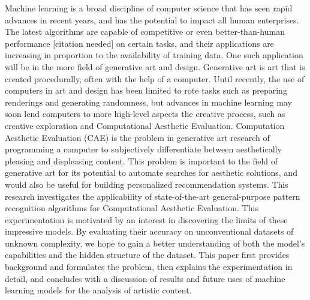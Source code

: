 \documentclass[midd]{thesis}
\begin{document}
Machine learning is a broad discipline of computer science that has seen rapid advances in recent years, and has the potential to impact all human enterprises. The latest algorithms are capable of competitive or even better-than-human performance [citation needed] on certain tasks, and their applications are increasing in proportion to the availability of training data. One such application will be in the more  field of generative art and design. Generative art is art that is created procedurally, often with the help of a computer. Until recently, the use of computers in art and design has been limited to rote tasks such as preparing renderings and generating randomness, but advances in machine learning may soon lend computers to more high-level aspects the creative process, such as creative exploration and Computational Aesthetic Evaluation. Computation Aesthetic Evaluation (CAE) is the problem in generative art research of programming a computer to subjectively differentiate between aesthetically pleasing and displeasing content. This problem is important to the field of generative art for its potential to automate searches for aesthetic solutions, and would also be useful for building personalized recommendation systems. This research investigates the applicability of state-of-the-art general-purpose pattern recognition algorithms for Computational Aesthetic Evaluation. This experimentation is motivated by an interest in discovering the limits of these impressive models. By evaluating their accuracy on unconventional datasets of unknown complexity, we hope to gain a better understanding of both the model's capabilities and the hidden structure of the dataset. This paper first provides background and formulates the problem, then explains the experimentation in detail, and concludes with a discussion of results and future uses of machine learning models for the analysis of artistic content.

\end{document}
